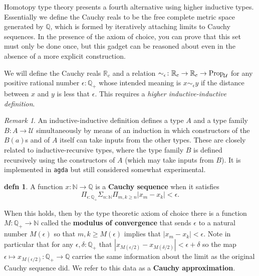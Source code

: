 \documentclass{amsart}
\theoremstyle{theorem}
\theoremstyle{definition}
\newtheorem*{defn}{defn}
\theoremstyle{remark}
\newtheorem*{rmk}{Remark}
\newcommand{\0}{\mathbbe{0}}
\newcommand{\1}{\mathbbe{1}}
\newcommand{\2}{\mathbbe{2}}
\newcommand{\3}{\mathbbe{3}}
\newcommand{\4}{\mathbbe{4}}
\newcommand{\NN}{\mathbb{N}}
\newcommand{\QQ}{\mathbb{Q}}
\newcommand{\RR}{\mathbb{R}}
\newcommand{\type}[1]{{\textup{#1}}}
\newcommand{\UU}{{\mathcal{U}}}
\newcommand{\Prop}{\type{Prop}_{\UU}}
\begin{document}
Homotopy type theory presents a fourth alternative using higher inductive types. Essentially we define the Cauchy reals to be the free complete metric space generated by $\QQ$, which is formed by iteratively attaching limits to Cauchy sequences. In the presence of the axiom of choice, you can prove that this set must only be done once, but this gadget can be reasoned about even in the absence of a more explicit construction.

We will define the Cauchy reals $\RR_c$ and a relation $\sim_\epsilon \colon \RR_c \to \RR_c \to \Prop$ for any positive rational number $\epsilon : \QQ_+$ whose intended meaning is $x \sim_\epsilon y$ if the distance between $x$ and $y$ is less that $\epsilon$. This requires a \emph{higher inductive-inductive definition}.

\begin{rmk} An inductive-inductive definition defines a type $A$ and a type family $B \colon A \to \UU$ simultaneously by means of an induction in which constructors of the $B(a)$s and of $A$ itself can take inputs from the other types. These are closely related to inductive-recursive types, where the type family $B$ is defined recursively using the constructors of $A$ (which may take inputs from $B$). It is implemented in \texttt{agda} but still considered somewhat experimental.
\end{rmk}

\begin{defn} 
A function $x \colon \NN \to \QQ$ is a \textbf{Cauchy sequence} when it satisfies
\[ \Pi_{\epsilon : \QQ_+} \Sigma_{n :\NN} \Pi_{m,k \geq n} |x_m-x_k| < \epsilon.\]
\end{defn}
When this holds, then by the type theoretic axiom of choice there is a function $M : \QQ_+ \to \NN$ called the \textbf{modulus of convergence} that sends $\epsilon$ to a natural number $M(\epsilon)$ so that $m,k \geq M(\epsilon)$ implies that $|x_m-x_k| < \epsilon$. Note in particular that for any $\epsilon,\delta : \QQ_+$ that $|x_{M(\epsilon/2)} - x_{M(\delta/2)} | < \epsilon + \delta$ so the map $\epsilon \mapsto x_{M(\epsilon/2)} : \QQ_+ \to \QQ$ carries the same information about the limit as the original Cauchy sequence did. We refer to this data as a \textbf{Cauchy approximation}. 
\end{document}
